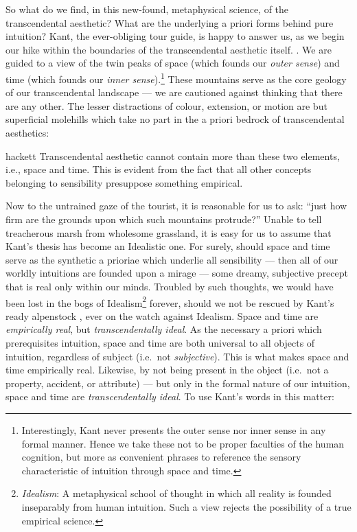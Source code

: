 So what do we find, in this new-found, metaphysical science, of the transcendental aesthetic? What are the underlying a priori forms behind pure intuition? Kant, the ever-obliging tour guide, is happy to answer us, as we begin our hike within the boundaries of the transcendental aesthetic itself. . We are guided to a view of the twin peaks of space (which founds our \emph{outer sense}) and time (which founds our \emph{inner sense}).\footnote{Interestingly, Kant never presents the outer sense nor inner sense in any formal manner. Hence we take these not to be proper faculties of the human cognition, but more as convenient phrases to reference the sensory characteristic of intuition through space and time.} These mountains serve as the core geology of our transcendental landscape --- we are cautioned against thinking that there are any other. The lesser distractions of colour, extension, or motion are but superficial molehills which take no part in the a priori bedrock of transcendental aesthetics:

\begin{displaycquote}[B58]{hackett}
  Transcendental aesthetic cannot contain more than these two elements, i.e., space and time. This is evident from the fact that all other concepts belonging to sensibility presuppose something empirical.
\end{displaycquote}

Now to the untrained gaze of the tourist, it is reasonable for us to ask: \enquote{just how firm are the grounds upon which such mountains protrude?} Unable to tell treacherous marsh from wholesome grassland, it is easy for us to assume that Kant's thesis has become an Idealistic one. For surely, should space and time serve as the synthetic a prioriae which underlie all sensibility --- then all of our worldly intuitions are founded upon a mirage --- some dreamy, subjective precept that is real only within our minds. Troubled by such thoughts, we would have been lost in the bogs of Idealism\footnote{\emph{Idealism}: A metaphysical school of thought in which all reality is founded inseparably from human intuition. Such a view rejects the possibility of a true empirical science.} forever, should we not be rescued by Kant's ready alpenstock
, ever on the watch against Idealism. Space and time are \emph{empirically real}, but \emph{transcendentally ideal}. As the necessary a priori which prerequisites intuition, space and time are both universal to all objects of intuition, regardless of subject (i.e.\ not \emph{subjective}). This is what makes space and time empirically real. Likewise, by not being present in the object (i.e.\ not a property, accident, or attribute) --- but only in the formal nature of our intuition, space and time are \emph{transcendentally ideal}. To use Kant's words in this matter:

